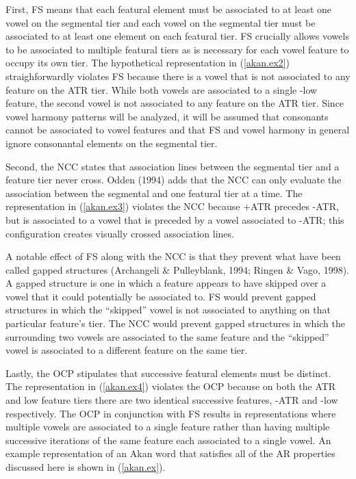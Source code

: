 \documentclass[,doc,floatsintext]{apa6}
\theoremstyle{definition}
\theoremstyle{definition}
\theoremstyle{definition}
\theoremstyle{remark}
\begin{document}
First, FS means that each featural element must be associated to at
least one vowel on the segmental tier and each vowel on the segmental
tier must be associated to at least one element on each featural tier.
FS crucially allows vowels to be associated to multiple featural tiers
as is necessary for each vowel feature to occupy its own tier. The
hypothetical representation in (\ref{akan.ex2}) straighforwardly
violates FS because there is a vowel that is not associated to any
feature on the ATR tier. While both vowels are associated to a single
-low feature, the second vowel is not associated to any feature on the
ATR tier. Since vowel harmony patterns will be analyzed, it will be
assumed that consonants cannot be associated to vowel features and that
FS and vowel harmony in general ignore consonantal elements on the
segmental tier.

Second, the NCC states that association lines between the segmental tier
and a feature tier never cross. Odden (1994) adds that the NCC can only
evaluate the association between the segmental and one featural tier at
a time. The representation in (\ref{akan.ex3}) violates the NCC because
+ATR precedes -ATR, but is associated to a vowel that is preceded by a
vowel associated to -ATR; this configuration creates visually crossed
association lines.

A notable effect of FS along with the NCC is that they prevent what have
been called gapped structures (Archangeli \& Pulleyblank, 1994; Ringen
\& Vago, 1998). A gapped structure is one in which a feature appears to
have skipped over a vowel that it could potentially be associated to. FS
would prevent gapped structures in which the \enquote{skipped} vowel is
not associated to anything on that particular feature's tier. The NCC
would prevent gapped structures in which the surrounding two vowels are
associated to the same feature and the \enquote{skipped} vowel is
associated to a different feature on the same tier.

Lastly, the OCP stipulates that successive featural elements must be
distinct. The representation in (\ref{akan.ex4}) violates the OCP
because on both the ATR and low feature tiers there are two identical
successive features, -ATR and -low respectively. The OCP in conjunction
with FS results in representations where multiple vowels are associated
to a single feature rather than having multiple successive iterations of
the same feature each associated to a single vowel. An example
representation of an Akan word that satisfies all of the AR properties
discussed here is shown in (\ref{akan.ex}).
\end{document}

